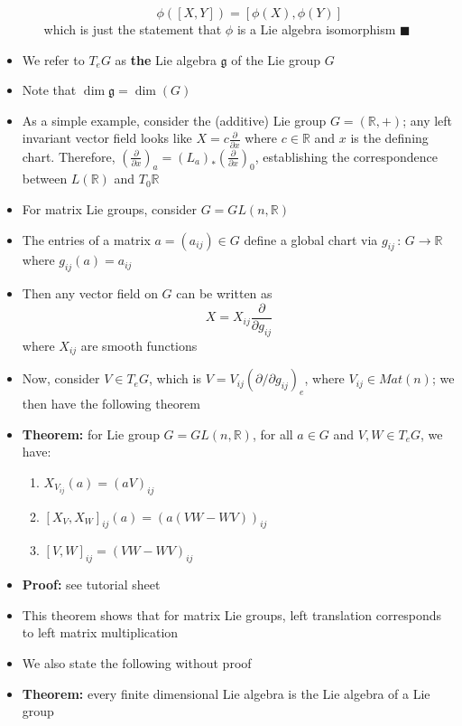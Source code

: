 \documentclass[12pt,a4paper]{article}
\numberwithin{equation}{section}
\begin{document}
\begin{itemize}
\begin{itemize}
			\begin{equation}
				\phi([X,Y])=[\phi(X),\phi(Y)]
			\end{equation}
			which is just the statement that $\phi$ is a Lie algebra isomorphism $\blacksquare$
		\end{itemize}
		\item We refer to $T_{e}G$ as \textbf{the} Lie algebra $\mathfrak{g}$ of the Lie group $G$
		\item Note that $\dim{\mathfrak{g}}=\dim(G)$
		\item As a simple example, consider the (additive) Lie group $G=(\mathbb{R},+)$; any left invariant vector field looks like $X=c\frac{\partial}{\partial x}$ where $c\in \mathbb{R}$ and $x$ is the defining chart. Therefore, $\left(\frac{\partial}{\partial x}\right)_{a}=(L_{a})_{*}\left(\frac{\partial}{\partial x}\right)_{0}$, establishing the correspondence between $L(\mathbb{R})$ and $T_{0}\mathbb{R}$
		\item For matrix Lie groups, consider $G=GL(n,\mathbb{R})$
		\item The entries of a matrix $a=(a_{ij})\in G$ define a global chart via $g_{ij}\,:\,G\to \mathbb{R}$ where $g_{ij}(a)=a_{ij}$
		\item Then any vector field on $G$ can be written as
		\begin{equation}
			X=X_{ij}\frac{\partial}{\partial g_{ij}}
		\end{equation}
		where $X_{ij}$ are smooth functions
		\item Now, consider $V\in T_{e}G$, which is $V=V_{ij}\left(\partial/\partial g_{ij}\right)_{e}$, where $V_{ij}\in Mat(n)$; we then have the following theorem
		\item \textbf{Theorem:} for Lie group $G=GL(n,\mathbb{R})$, for all $a\in G$ and $V,W\in T_{e}G$, we have:
		\begin{enumerate}
			\item $X_{V_{ij}}(a)=(aV)_{ij}$
			\item $[X_{V},X_{W}]_{ij}(a)=(a(VW-WV))_{ij}$
			\item $[V,W]_{ij}=(VW-WV)_{ij}$
		\end{enumerate}
		\item \textbf{Proof:} see tutorial sheet
		\item This theorem shows that for matrix Lie groups, left translation corresponds to left matrix multiplication
		\item We also state the following without proof
		\item \textbf{Theorem:} every finite dimensional Lie algebra is the Lie algebra of a Lie group
	\end{itemize}
\end{document}
